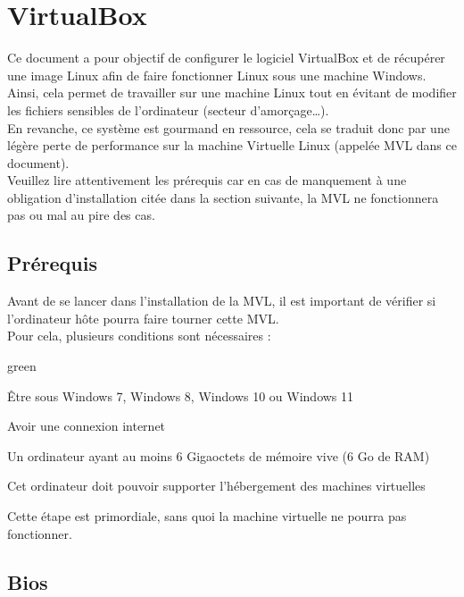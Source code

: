 \chapter{VirtualBox}


Ce document a pour objectif de configurer le logiciel VirtualBox et de récupérer une image Linux 
afin de faire fonctionner Linux sous une machine Windows.\\
Ainsi, cela permet de travailler sur une machine Linux tout en évitant de modifier les fichiers 
sensibles de l’ordinateur (secteur d’amorçage…).\\
En revanche, ce système est gourmand en ressource, cela se traduit donc par une légère perte de 
performance sur la machine Virtuelle Linux (appelée MVL dans ce document).\\

Veuillez lire attentivement les prérequis car en cas de manquement à une obligation d’installation 
citée dans la section suivante, la MVL ne fonctionnera pas ou mal au pire des cas.\\



\section{Prérequis}


Avant de se lancer dans l’installation de la MVL, il est important de vérifier si l’ordinateur 
hôte pourra faire tourner cette MVL.\\
Pour cela, plusieurs conditions sont nécessaires :

\begin{items}{green}{\faviconCheck}
\item Être sous Windows 7, Windows 8, Windows 10 ou Windows 11
\item Avoir une connexion internet
\item Un ordinateur ayant au moins 6 Gigaoctets de mémoire vive (6 Go de RAM)
\item Cet ordinateur doit pouvoir supporter l’hébergement des machines virtuelles
\end{items}

Cette étape est primordiale, sans quoi la machine virtuelle ne pourra pas fonctionner.



\section{Bios}

